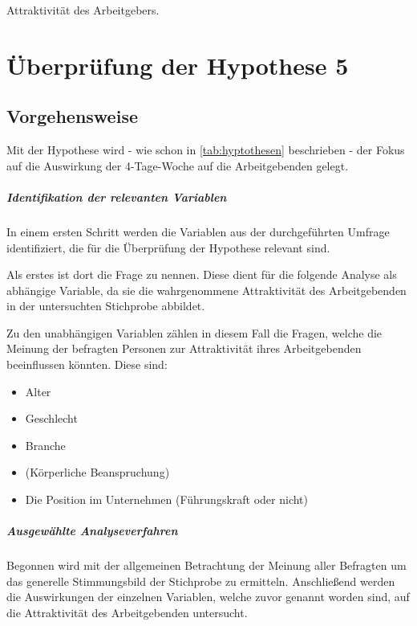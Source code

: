 Attraktivität des Arbeitgebers. 

\chapter{Überprüfung der Hypothese 5}
\label{chap:hypothese5}


\section{Vorgehensweise}
Mit der Hypothese  wird - wie schon in \ref{tab:hyptothesen} beschrieben - der 
Fokus auf die Auswirkung der 4-Tage-Woche auf die Arbeitgebenden gelegt. 

\paragraph{Identifikation der relevanten Variablen}
In einem ersten Schritt werden die Variablen aus der durchgeführten Umfrage identifiziert, die für die 
Überprüfung der Hypothese relevant sind.

Als erstes ist dort die Frage  zu nennen. Diese dient für die folgende Analyse als abhängige 
Variable, da sie die wahrgenommene Attraktivität des Arbeitgebenden in der untersuchten Stichprobe abbildet.

Zu den unabhängigen Variablen zählen in diesem Fall die Fragen, welche die Meinung der befragten 
Personen zur Attraktivität ihres Arbeitgebenden beeinflussen könnten. Diese sind:
\begin{itemize}
  \item Alter
  \item Geschlecht
  \item Branche
  \item (Körperliche Beanspruchung)
  \item Die Position im Unternehmen (Führungskraft oder nicht)
\end{itemize}

\paragraph{Ausgewählte Analyseverfahren} Begonnen wird mit der allgemeinen Betrachtung der Meinung 
aller Befragten um das generelle Stimmungsbild der Stichprobe zu ermitteln. Anschließend werden die Auswirkungen
der einzelnen Variablen, welche zuvor genannt worden sind, auf die Attraktivität des Arbeitgebenden untersucht.

